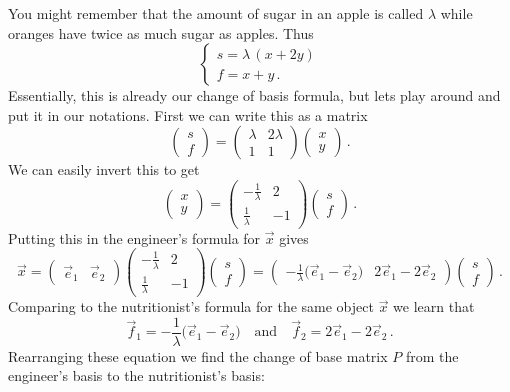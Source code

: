 {You might remember that the amount of sugar in an apple 
is called $\lambda$ while oranges have twice as much sugar as apples.
Thus
\[
\left\{
\begin{array}{l}
s=\lambda\, (x+2y)\\
f=x+y\, .
\end{array}
\right.
\]
Essentially, this is already our change of basis formula, but lets play around and put it in our notations.
First we can write this as a matrix
\[
\begin{pmatrix}s\\f\end{pmatrix}=
\begin{pmatrix}\lambda & 2\lambda \\1 & 1
\end{pmatrix}
\begin{pmatrix}x\\y\end{pmatrix}\, .
\]
We can easily invert this to get
\[
\begin{pmatrix}x\\y\end{pmatrix}
=
\begin{pmatrix}-\frac1\lambda & 2\\ \frac1\lambda & -1
\end{pmatrix}
\begin{pmatrix}s\\f\end{pmatrix}\, .
\]
Putting this in the engineer's formula for $\vec x$ gives
\[
\vec x = 
\begin{pmatrix}\vec e_1 & \vec e_2\end{pmatrix}
\begin{pmatrix}-\frac1\lambda & 2\\ \frac1\lambda & -1
\end{pmatrix}
\begin{pmatrix}s\\f\end{pmatrix}
=
\begin{pmatrix}-\frac1\lambda\big(\vec e_1 - \vec e_2\big) &
2\vec e_1-2\vec e_2\end{pmatrix}
\begin{pmatrix}s\\f\end{pmatrix}\, .
\]
Comparing to the nutritionist's formula for the same object $\vec x$ we learn that
\[
\vec f_1 = -\frac1\lambda\big(\vec e_1 - \vec e_2\big)\quad \mbox{and}\quad
\vec f_2=2\vec e_1-2\vec e_2\, .
\]
Rearranging these equation we find the change of base matrix $P$ from the engineer's basis to the nutritionist's basis:
}
